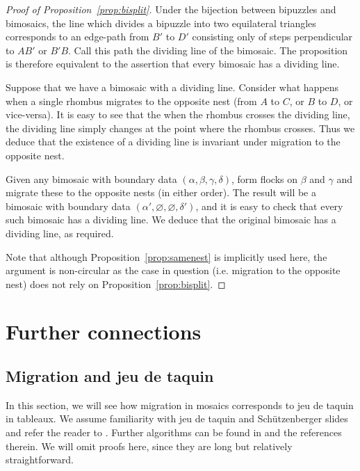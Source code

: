 \documentclass[12pt]{article}
\begin{document}
\begin{proof}[Proof of Proposition~\ref{prop:bisplit}]
Under the bijection between bipuzzles and bimosaics, the
line which divides a bipuzzle into two equilateral triangles
corresponds to an edge-path from
$B'$ to $D'$ consisting only of steps perpendicular to $AB'$ or
$B'B$.  Call this path the dividing line of the bimosaic.
The proposition is therefore equivalent to the assertion
that every bimosaic has a dividing line.

Suppose that we have a bimosaic with a dividing line. 
Consider what happens when a single rhombus migrates to the opposite
nest (from $A$ to $C$, or $B$ to $D$, or vice-versa).  
It is easy to see that the when the rhombus
crosses the dividing line, the dividing line simply changes at the
point where the rhombus crosses.  Thus we deduce that the existence of 
a dividing line is invariant under migration to the opposite nest.

Given any bimosaic with boundary data $(\alpha, \beta, \gamma, \delta)$,
form flocks on $\beta$ and $\gamma$ and migrate these to the opposite
nests (in either order).  The result will be a bimosaic with
boundary data $(\alpha', \varnothing, \varnothing, \delta')$, and it is easy
to check that every such bimosaic has a dividing line.  We deduce that
the original bimosaic has a dividing line, as required.

Note that although Proposition~\ref{prop:samenest} 
is implicitly used here, the argument is non-circular as the case
in question (i.e. migration to the opposite nest)
does not rely on Proposition~\ref{prop:bisplit}.
\end{proof}

\section{Further connections}
\label{sec:further}
\subsection{Migration and jeu de taquin}
\label{sec:jdt}

In this section, we will see how migration in mosaics corresponds to
jeu de taquin in tableaux.  We assume familiarity with jeu de taquin
and Sch\"utzenberger slides \cite{schutzenberger} and refer the reader 
to \cite{fulton:tableaux}.  Further algorithms can be found in
\cite{benkart-sottile-stroomer} and the references therein.
We will omit proofs here, since they are long but relatively 
straightforward.
\end{document}
